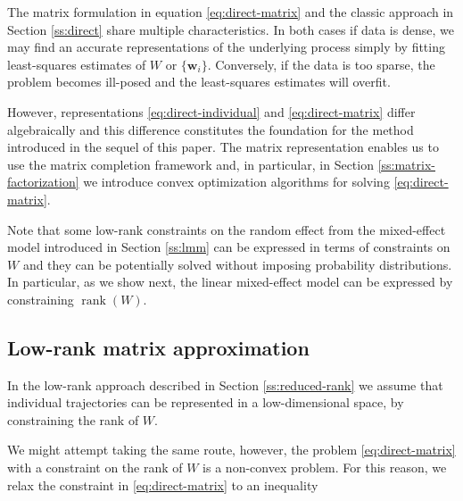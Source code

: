 \documentclass[preprint]{imsart}
\numberwithin{equation}{section}
\theoremstyle{plain}
\newcommand{\N}{\mathbb{N}}
\newcommand{\bw}{\mathbf{w}}
\DeclareMathOperator*{\rank}{rank}
\begin{document}
The matrix formulation in equation \eqref{eq:direct-matrix} and the classic approach in Section \ref{ss:direct} share multiple characteristics. In both cases if data is dense, we may find an accurate representations of the underlying process simply by fitting least-squares estimates of $W$ or $\{\bw_i\}$. Conversely, if the data is too sparse, the problem becomes ill-posed and the least-squares estimates will overfit. %

However, representations \eqref{eq:direct-individual} and \eqref{eq:direct-matrix} differ algebraically and this difference constitutes the foundation for the method introduced in the sequel of this paper. The matrix representation enables us to use the matrix completion framework and, in particular, in Section \ref{ss:matrix-factorization} we introduce convex optimization algorithms for solving \eqref{eq:direct-matrix}. %

Note that some low-rank constraints on the random effect from the mixed-effect model introduced in Section \ref{ss:lmm} can be expressed in terms of constraints on $W$ and they can be potentially solved without imposing probability distributions. In particular, as we show next, the linear mixed-effect model can be expressed by constraining $\rank(W)$. %

\subsection{Low-rank matrix approximation}\label{ss:low-rank-matrix}
In the low-rank approach described in Section \ref{ss:reduced-rank} we assume that individual trajectories can be represented in a low-dimensional space, by constraining the rank of $W$.

We might attempt taking the same route, however, the problem \eqref{eq:direct-matrix} with a constraint on the rank of $W$ is a non-convex problem. For this reason, we relax the constraint in \eqref{eq:direct-matrix} to an inequality

\end{document}
